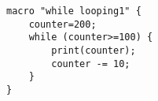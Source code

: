 \begin{lstlisting}
macro "while looping1" {
	counter=200;
	while (counter>=100) {
		print(counter);
		counter -= 10;
	}
}

\end{lstlisting}